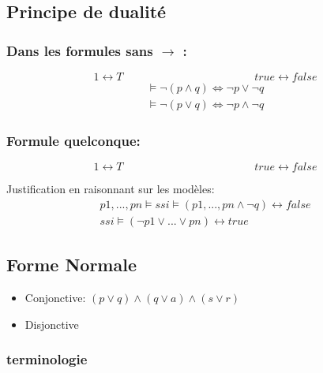 \subsection{Principe de dualité }

\subsubsection{Dans les formules sans $\rightarrow$ :}

\begin{equation}
1 \leftrightarrow T \hspace{5cm} true \leftrightarrow false 
\end{equation}
\begin{align*}
\models \lnot ( p \land q)  \Leftrightarrow \lnot p \lor \lnot q \\
\models \lnot ( p \lor q)  \Leftrightarrow \lnot p \land \lnot q 
\end{align*}

\subsubsection{Formule quelconque:}

\begin{equation}
	1 \leftrightarrow T \hspace{5cm} true \leftrightarrow false 
\end{equation}

 Justification en raisonnant sur les modèles:
 \begin{align*}
	 p1,...,pn \models ssi \models (p1,...,pn \land \lnot q) \leftrightarrow false \\
	 ssi \models ( \lnot p1 \lor ... \lor pn) \leftrightarrow true
 \end{align*}

\subsection{Forme Normale}

\begin{itemize}
  \item Conjonctive: $( p \lor q ) \land ( q \lor a ) \land ( s \lor r )$  
  \item Disjonctive
\end{itemize}

\subsubsection{terminologie}

